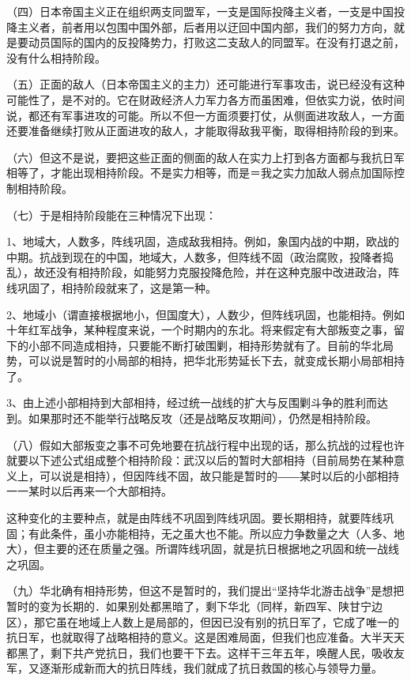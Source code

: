 （四）日本帝国主义正在组织两支同盟军，一支是国际投降主义者，一支是中国投降主义者，前者用以包围中国外部，后者用以迂回中国内部，我们的努力方向，就是要动员国际的国内的反投降势力，打败这二支敌人的同盟军。在没有打退之前，没有什么相持阶段。

（五）正面的敌人（日本帝国主义的主力）还可能进行军事攻击，说已经没有这种可能性了，是不对的。它在财政经济人力军力各方而虽困难，但依实力说，依时间说，都还有军事进攻的可能。所以不但一方面须要打仗，从侧面进攻敌人，一方面还要准备继续打败从正面进攻的敌人，才能取得敌我平衡，取得相持阶段的到来。

（六）但这不是说，要把这些正面的侧面的敌人在实力上打到各方面都与我抗日军相等了，才能出现相持阶段。不是实力相等，而是＝我之实力加敌人弱点加国际控制相持阶段。

（七）于是相持阶段能在三种情况下出现：

1、地域大，人数多，阵线巩固，造成敌我相持。例如，象国内战的中期，欧战的中期。抗战到现在的中国，地域大，人数多，但阵线不固（政治腐败，投降者捣乱），故还没有相持阶段，如能努力克服投降危险，并在这种克服中改进政治，阵线巩固了，相持阶段就来了，这是第一种。

2、地域小（谓直接根据地小，但国度大），人数少，但阵线巩固，也能相持。例如十年红军战争，某种程度来说，一个时期内的东北。将来假定有大部叛变之事，留下的小部不同造成相持，只要能不断打破围剿，相持形势就有了。目前的华北局势，可以说是暂时的小局部的相持，把华北形势延长下去，就变成长期小局部相持了。

3、由上述小部相持到大部相持，经过统一战线的扩大与反围剿斗争的胜利而达到。如果那时还不能举行战略反攻（还是战略反攻期间），仍然是相持阶段。

（八）假如大部叛变之事不可免地要在抗战行程中出现的话，那么抗战的过程也许就要以下述公式组成整个相持阶段：武汉以后的暂时大部相持（目前局势在某种意义上，可以说是相持），但因阵线不固，故只能是暂时的――某时以后的小部相持一一某时以后再来一个大部相持。

这种变化的主要种点，就是由阵线不巩固到阵线巩固。要长期相持，就要阵线巩固；有此条件，虽小亦能相持，无之虽大也不能。所以应力争数量之大（人多、地大），但主要的还在质量之强。所谓阵线巩固，就是抗日根据地之巩固和统一战线之巩固。

（九）华北确有相持形势，但这不是暂时的，我们提出“坚持华北游击战争”是想把暂时的变为长期的．如果别处都黑暗了，剩下华北（同样，新四军、陕甘宁边区），那它虽在地域上人数上是局部的，但因已没有别的抗日军了，它成了唯一的抗日军，也就取得了战略相持的意义。这是困难局面，但我们也应准备。大半天天都黑了，剩下共产党抗日，我们也要干下去。这样干三年五年，唤醒人民，吸收友军，又逐渐形成新而大的抗日阵线，我们就成了抗日救国的核心与领导力量。

